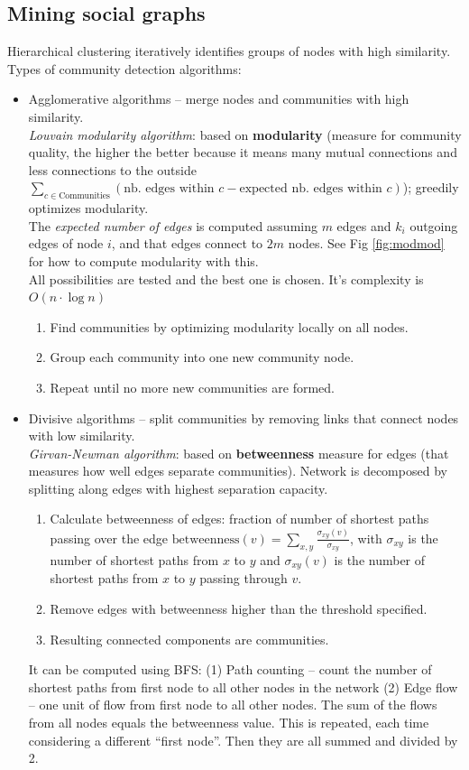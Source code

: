 \subsection{Mining social graphs} %
\label{sub:mining_social_graphs}
	Hierarchical clustering iteratively identifies groups of nodes with high similarity. Types of community detection algorithms:
	\begin{itemize}
		\item Agglomerative algorithms -- merge nodes and communities with high similarity.\\
		\emph{Louvain modularity algorithm}: based on \textbf{modularity} (measure for community quality, the higher the better because it means many mutual connections and less connections to the outside\\
        $\sum_{c\in\text{Communities}}{(\text{nb. edges within }c-\text{expected nb. edges within }c)}$); greedily optimizes modularity.\\
		The \emph{expected number of edges} is computed assuming $m$ edges and $k_i$ outgoing edges of node $i$, and that edges connect to $2m$ nodes. See Fig \ref{fig:modmod} for how to compute modularity with this.\\
		All possibilities are tested and the best one is chosen. It's complexity is $O(n\cdot\log{n})$
		\begin{enumerate}
			\item Find communities by optimizing modularity locally on all nodes.
			\item Group each community into one new community node.
			\item Repeat until no more new communities are formed.
		\end{enumerate}
		\item Divisive algorithms -- split communities by removing links that connect nodes with low similarity.\\
		\emph{Girvan-Newman algorithm}: based on \textbf{betweenness} measure for edges (that measures how well edges separate communities). Network is decomposed by splitting along edges with highest separation capacity.
		\begin{enumerate}
			\item Calculate betweenness of edges: fraction of number of shortest paths passing over the edge $\text{betweenness}(v)=\sum_{x,y}{\frac{\sigma_{xy}(v)}{\sigma_{xy}}}$, with $\sigma_{xy}$ is the number of shortest paths from $x$ to $y$ and $\sigma_{xy}(v)$ is the number of shortest paths from $x$ to $y$ passing through $v$.
			\item Remove edges with betweenness higher than the threshold specified.
			\item Resulting connected components are communities.
		\end{enumerate}
		It can be computed using BFS: (1) Path counting -- count the number of shortest paths from first node to all other nodes in the network (2) Edge flow -- one unit of flow from first node to all other nodes. The sum of the flows from all nodes equals the betweenness value. This is repeated, each time considering a different ``first node''. Then they are all summed and divided by 2.
	\end{itemize}

